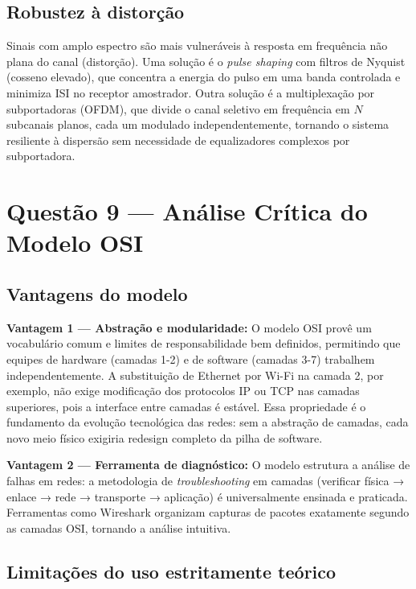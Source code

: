 \documentclass[conference]{IEEEtran}
\begin{document}
\subsection*{Robustez à distorção}

Sinais com amplo espectro são mais vulneráveis à resposta em frequência não plana do canal
(distorção). Uma solução é o \textit{pulse shaping} com filtros de Nyquist (cosseno elevado),
que concentra a energia do pulso em uma banda controlada e minimiza ISI no receptor
amostrador. Outra solução é a multiplexação por subportadoras (OFDM), que divide o canal
seletivo em frequência em $N$ subcanais planos, cada um modulado independentemente, tornando
o sistema resiliente à dispersão sem necessidade de equalizadores complexos por subportadora.

\section*{Questão 9 — Análise Crítica do Modelo OSI}

\subsection*{Vantagens do modelo}

\textbf{Vantagem 1 --- Abstração e modularidade:} O modelo OSI provê um vocabulário comum
e limites de responsabilidade bem definidos, permitindo que equipes de hardware (camadas 1-2)
e de software (camadas 3-7) trabalhem independentemente. A substituição de Ethernet por
Wi-Fi na camada 2, por exemplo, não exige modificação dos protocolos IP ou TCP nas camadas
superiores, pois a interface entre camadas é estável. Essa propriedade é o fundamento da
evolução tecnológica das redes: sem a abstração de camadas, cada novo meio físico exigiria
redesign completo da pilha de software.

\textbf{Vantagem 2 --- Ferramenta de diagnóstico:} O modelo estrutura a análise de falhas
em redes: a metodologia de \textit{troubleshooting} em camadas (verificar física → enlace →
rede → transporte → aplicação) é universalmente ensinada e praticada. Ferramentas como
Wireshark organizam capturas de pacotes exatamente segundo as camadas OSI, tornando a
análise intuitiva.

\subsection*{Limitações do uso estritamente teórico}
\end{document}

